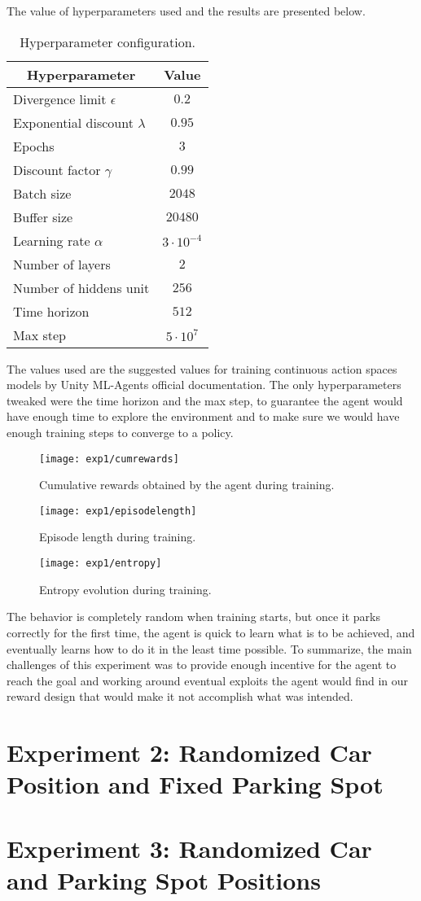 The value of hyperparameters used and the results are presented below. 
\begin{table}[H]
    \begin{tabular}{|l|c|}
    \hline \multicolumn{1}{|c|}{ Hyperparameter } & Value \\
    \hline Divergence limit $\epsilon$ & $0.2$ \\
    \hline Exponential discount $\lambda$ & $0.95$ \\
    \hline Epochs & $3$ \\
    \hline Discount factor $\gamma$ & $0.99$ \\
    \hline Batch size & $2048$ \\
    \hline Buffer size & $20480$ \\
    \hline Learning rate $\alpha$ & $3 \cdot 10^{-4}$ \\
    \hline Number of layers & $2$ \\
    \hline Number of hiddens unit & $256$ \\
    \hline Time horizon & $512$ \\
    \hline Max step & $5\cdot 10^{7}$ \\
    \hline
    \end{tabular}
    \caption{\label{tab:hyperparameters}Hyperparameter configuration.}
    \end{table}
The values used are the suggested values for training continuous action spaces models by Unity ML-Agents official documentation. The only hyperparameters tweaked were the time horizon and the max step, to guarantee the agent would have enough time to explore the environment and to make sure we would have enough training steps to converge to a policy.
\begin{figure}[H]
    \texttt{[image: exp1/cumrewards]}
    \caption{Cumulative rewards obtained by the agent during training.}
    \label{fig:cumrewards1}
\end{figure}
\begin{figure}[H]
    \texttt{[image: exp1/episodelength]}
    \caption{Episode length during training.}
    \label{fig:episodelength1}
\end{figure}
\begin{figure}[H]
    \texttt{[image: exp1/entropy]}
    \caption{Entropy evolution during training.}
    \label{fig:entropy1}
\end{figure}
The behavior is completely random when training starts, but once it parks correctly for the first time, the agent is quick to learn what is to be achieved, and eventually learns how to do it in the least time possible. To summarize, the main challenges of this experiment was to provide enough incentive for the agent to reach the goal and working around eventual exploits the agent would find in our reward design that would make it not accomplish what was intended.
\section{Experiment 2: Randomized Car Position and Fixed Parking Spot}
\section{Experiment 3: Randomized Car and Parking Spot Positions}